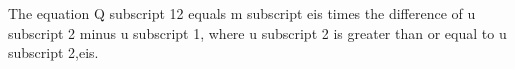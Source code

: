 The equation Q subscript 12 equals m subscript eis times the difference of u subscript 2 minus u subscript 1, where u subscript 2 is greater than or equal to u subscript 2,eis.